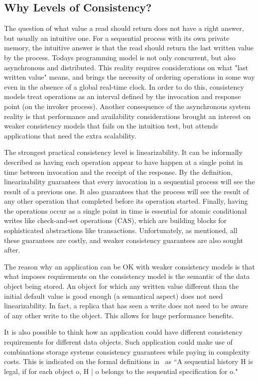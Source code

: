 \documentclass[12pt,conference]{IEEEtran}
\begin{document}
\subsection{Why Levels of Consistency?}

The question of what value a read should return does not have a right answer, but usually an intuitive one. For a sequential process with its own private memory, the intuitive answer is that the read should return the last written value by the process. Todays programming model is not only concurrent, but also asynchronous and distributed. This reality requires considerations on what "last written value" means, and brings the necessity of ordering operations in some way even in the absence of a global real-time clock. In order to do this, consistency models treat operations as an interval defined by the invocation and response point (on the invoker process). Another consequence of the asynchronous system reality is that performance and availability considerations brought an interest on weaker consistency models that fails on the intuition test, but attends applications that need the extra scalability.

The strongest practical consistency level is linearizability. It can be informally described as having each operation appear to have happen at a single point in time between invocation and the receipt of the response. By the definition, linearizability guarantees that every invocation in a sequential process will see the result of a previous one. It also guarantees that the process will see the result of any other operation that completed before its operation started. Finally, having the operations occur as a single point in time is essential for atomic conditional writes like check-and-set operations (CAS), which are building blocks for sophisticated abstractions like transactions. Unfortunately, as mentioned, all these guarantees are costly, and weaker consistency guarantees are also sought after.

The reason why an application can be OK with weaker consistency models is that what imposes requirements on the consistency model is the semantic of the data object being stored. An object for which any written value different than the initial default value is good enough (a semantical aspect) does not need linearizability. In fact, a replica that has seen a write does not need to be aware of any other write to the object. This allows for huge performance benefits. 

It is also possible to think how an application could have different consistency requirements for different data objects. Such application could make use of combinations storage systems consistency guarantees while paying in complexity costs. This is indicated on the formal definitions in~\cite{dziuma2013survey} as “A sequential history H is legal, if for each object o, H | o belongs to the sequential specification for o."
\end{document}

